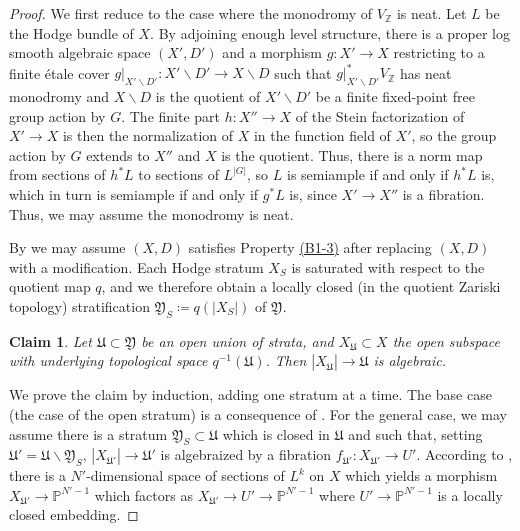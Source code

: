 \documentclass{amsart}
\newcommand{\customref}[2]{\hyperref[#1]{#2}}
\newcommand{\bs}{\backslash}
\newtheorem{claim}[theorem]{Claim}
\theoremstyle{definition}
\theoremstyle{remark}
\def\bZ{\mathbb{Z}}
\def\bP{\mathbb{P}}
\def\fY{\mathfrak{Y}}
\def\fU{\mathfrak{U}}
\numberwithin{equation}{section}
\begin{document}
\begin{proof}We first reduce to the case where the monodromy of $V_\bZ$ is neat.  Let $L$ be the Hodge bundle of $X$.  By adjoining enough level structure, there is a proper log smooth algebraic space $(X',D')$ and a morphism $g:X'\to X$ restricting to a finite \'etale cover $g|_{X'\bs D'}:X'\bs D'\to X\bs D$ such that $g|_{X'\bs D'}^*V_\bZ$ has neat monodromy and $X\bs D$ is the quotient of $X'\bs D'$ be a finite fixed-point free group action by $G$.  The finite part $h:X''\to X$ of the Stein factorization of $X'\to X$ is then the normalization of $X$ in the function field of $X'$, so the group action by $G$ extends to $X''$ and $X$ is the quotient.  Thus, there is a norm map from sections of $h^*L$ to sections of $L^{|G|}$, so $L$ is semiample if and only if $h^*L$ is, which in turn is semiample if and only if $g^*L$ is, since $X'\to X''$ is a fibration.  Thus, we may assume the monodromy is neat.  

By  we may assume $(X,D)$ satisfies Property \customref{b3}{(B1-3)} after replacing $(X,D)$ with a modification.  Each Hodge stratum $X_S$ is saturated with respect to the quotient map $q$, and we therefore obtain a locally closed (in the quotient Zariski topology) stratification $\fY_S\coloneqq  q(|X_S|)$ of $\fY$.


\begin{claim}\label{claim:Bundles Descend} Let $\fU\subset \fY$ be an open union of strata, and $X_\fU\subset X$ the open subspace with underlying topological space $q^{-1}(\fU)$.  Then $|X_\fU|\to \fU$ is algebraic. 

\end{claim}

We prove the claim by induction, adding one stratum at a time.  The base case (the case of the open stratum) is a consequence of \cite[Theorem 1.1]{BBT23}.  For the general case, we may assume there is a stratum $\fY_S\subset \fU$ which is closed in $\fU$ and such that, setting $\fU'=\fU\bs \fY_S$, $|X_{\fU'}|\to \fU'$ is algebraized by a fibration $f_{
\fU'}:X_{\fU'}\to U'$.  According to , there is a $N'$-dimensional space of sections of $L^k$ on $X$ which yields a morphism $X_{\fU'}\to \bP^{N'-1}$ which factors as $X_{\fU'}\to U'\to \bP^{N'-1}$ where $U'\to \bP^{N'-1}$ is a locally closed embedding.  


\end{proof}
\end{document}
